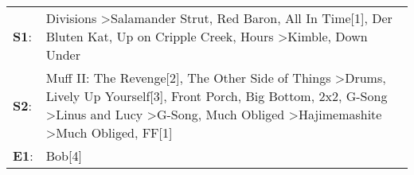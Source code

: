 \begin{supertabular}{p{0.03\textwidth}p{0.92\textwidth}}
 \textbf{S1}:  &                                                                                                                                                                                                                                                      Divisions\textsuperscript{} \textgreater \enspace Salamander Strut\textsuperscript{}, \enspace Red Baron\textsuperscript{}, \enspace All In Time[1]\textsuperscript{}, \enspace Der Bluten Kat\textsuperscript{}, \enspace Up on Cripple Creek\textsuperscript{}, \enspace Hours\textsuperscript{} \textgreater \enspace Kimble\textsuperscript{}, \enspace Down Under\textsuperscript{}  \enspace  \\
 \textbf{S2}:  &  Muff II: The Revenge[2]\textsuperscript{}, \enspace The Other Side of Things\textsuperscript{} \textgreater \enspace Drums\textsuperscript{}, \enspace Lively Up Yourself[3]\textsuperscript{}, \enspace Front Porch\textsuperscript{}, \enspace Big Bottom\textsuperscript{}, \enspace 2x2\textsuperscript{}, \enspace G-Song\textsuperscript{} \textgreater \enspace Linus and Lucy\textsuperscript{} \textgreater \enspace G-Song\textsuperscript{}, \enspace Much Obliged\textsuperscript{} \textgreater \enspace Hajimemashite\textsuperscript{} \textgreater \enspace Much Obliged\textsuperscript{}, \enspace FF[1]\textsuperscript{}  \enspace  \\
 \textbf{E1}:  &                                                                                                                                                                                                                                                                                                                                                                                                                                                                                                                                                                                                                      Bob[4]\textsuperscript{}  \enspace  \\
\end{supertabular}
